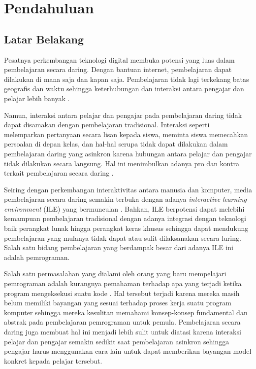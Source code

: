 \chapter{Pendahuluan}

\section{Latar Belakang}
\label{sec:latarbelakang}

Pesatnya perkembangan teknologi digital membuka potensi yang luas dalam pembelajaran secara daring. Dengan bantuan internet, pembelajaran dapat dilakukan di mana saja dan kapan saja. Pembelajaran tidak lagi terkekang batas geografis dan waktu sehingga keterhubungan dan interaksi antara pengajar dan pelajar lebih banyak \parencite{choy2004interactive,keengwe2010towards,psotka2012ile}.

Namun, interaksi antara pelajar dan pengajar pada pembelajaran daring tidak dapat disamakan dengan pembelajaran tradisional. Interaksi seperti melemparkan pertanyaan secara lisan kepada siswa, meminta siswa memecahkan persoalan di depan kelas, dan hal-hal serupa tidak dapat dilakukan dalam pembelajaran daring yang asinkron karena hubungan antara pelajar dan pengajar tidak dilakukan secara langsung. Hal ini menimbulkan adanya pro dan kontra terkait pembelajaran secara daring \parencite{radovic2010advantages}.

Seiring dengan perkembangan interaktivitas antara manusia dan komputer, media pembelajaran secara daring semakin terbuka dengan adanya \textit{interactive learning environment} (ILE) yang bermunculan \parencite{psotka2012ile}. Bahkan, ILE berpotensi dapat melebihi kemampuan pembelajaran tradisional dengan adanya integrasi dengan teknologi baik perangkat lunak hingga perangkat keras khusus sehingga dapat mendukung pembelajaran yang mulanya tidak dapat atau sulit dilaksanakan secara luring. Salah satu bidang pembelajaran yang berdampak besar dari adanya ILE ini adalah pemrograman.

Salah satu permasalahan yang dialami oleh orang yang baru mempelajari pemrograman adalah kurangnya pemahaman terhadap apa yang terjadi ketika program mengeksekusi suatu kode \parencite{mayer1981psychology}. Hal tersebut terjadi karena mereka masih belum memiliki bayangan yang sesuai terhadap proses kerja suatu program komputer sehingga mereka kesulitan memahami konsep-konsep fundamental dan abstrak pada pembelajaran pemrograman untuk pemula. Pembelajaran secara daring juga membuat hal ini menjadi lebih sulit untuk diatasi karena interaksi pelajar dan pengajar semakin sedikit saat pembelajaran asinkron sehingga pengajar harus menggunakan cara lain untuk dapat memberikan bayangan model konkret kepada pelajar tersebut.

